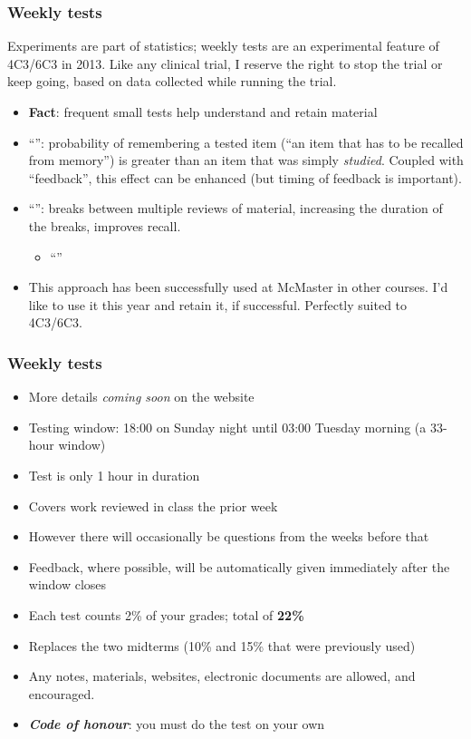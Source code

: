\begin{frame}\frametitle{Weekly tests}
	\begin{exampleblock}{}
		Experiments are part of statistics; weekly tests are an experimental feature of 4C3/6C3 in 2013. Like any clinical trial, I reserve the right to stop the trial or keep going, based on data collected while running the trial.
	\end{exampleblock}

	\begin{itemize}
		\item	\textbf{Fact}: frequent small tests help understand and retain material
		\item	``\emph{{\color{purple}{Testing effect}}}'': probability of remembering a tested item (``an item that has to be recalled from memory'') is greater than an item that was simply \emph{studied}. Coupled with ``feedback'', this effect can be enhanced (but timing of feedback is important).
		\item	``{\color{purple}{Spacing effect}}'': breaks between multiple reviews of material, increasing the duration of the breaks, improves recall.
			\begin{itemize}
				\item	``{}''
			\end{itemize}
		
		\item	This approach has been successfully used at McMaster in other courses. I'd like to use it this year and retain it, if successful. Perfectly suited to 4C3/6C3.
	\end{itemize}
\end{frame}

\begin{frame}\frametitle{Weekly tests}
	\begin{itemize}
		\item	More details \emph{coming soon} on the website
		\item	Testing window: 18:00 on Sunday night until 03:00 Tuesday morning (a 33-hour window)
		\item	Test is only 1 hour in duration
		\item	Covers work reviewed in class the prior week
		\item	However there will occasionally be questions from the weeks before that
		\item	Feedback, where possible, will be automatically given immediately after the window closes
		\item	Each test counts 2\% of your grades; total of \textbf{22\%}
		\item	Replaces the two midterms (10\% and 15\% that were previously used)
		\item	Any notes, materials, websites, electronic documents are allowed, and encouraged.
		\item	\textbf{\emph{Code of honour}}: you must do the test on your own
	\end{itemize}
\end{frame}

